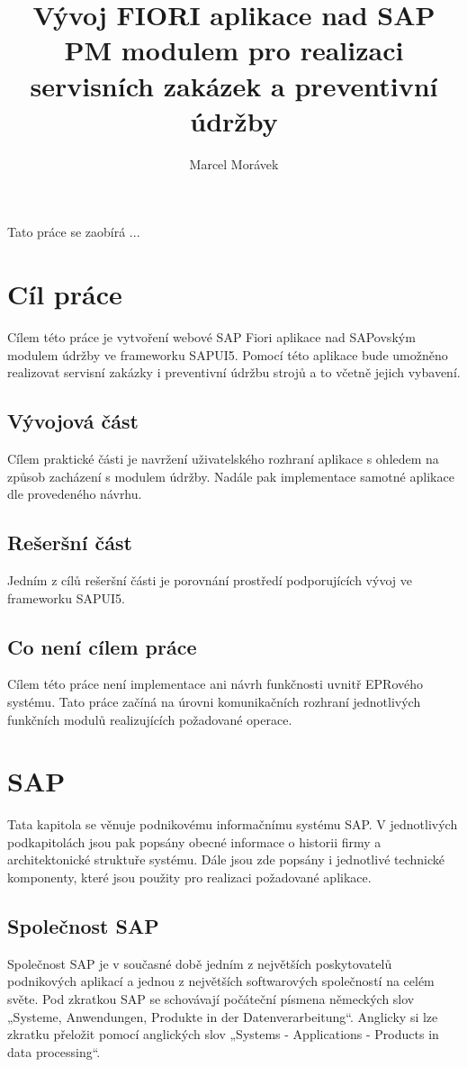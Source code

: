 \documentclass[thesis=M,czech]{FITthesis}[2012/06/26]
\title{Vývoj FIORI aplikace nad SAP PM modulem pro realizaci servisních zakázek a preventivní údržby}
\author{Marcel Morávek} %
\begin{document}

\begin{introduction}
	Tato práce se zaobírá ...
\end{introduction}

\chapter{Cíl práce}
Cílem této práce je vytvoření webové SAP Fiori aplikace nad SAPovským modulem údržby ve frameworku SAPUI5. Pomocí této aplikace bude umožněno realizovat servisní zakázky i preventivní údržbu strojů a to včetně jejich vybavení.

\section{Vývojová část}
Cílem praktické části je navržení uživatelského rozhraní aplikace s ohledem na způsob zacházení s modulem údržby. Nadále pak implementace samotné aplikace dle provedeného návrhu. 

\section{Rešeršní část}
Jedním z cílů rešeršní části je porovnání prostředí podporujících vývoj ve frameworku SAPUI5. 

\section{Co není cílem práce}
Cílem této práce není implementace ani návrh funkčnosti uvnitř EPRového systému. Tato práce začíná na úrovni komunikačních rozhraní jednotlivých funkčních modulů realizujících požadované operace. 

\chapter{SAP}
Tata kapitola se věnuje podnikovému informačnímu systému SAP. V jednotlivých podkapitolách jsou pak popsány obecné informace o historii firmy a architektonické struktuře systému. Dále jsou zde popsány i jednotlivé technické komponenty, které jsou použity pro realizaci požadované aplikace. 
\section{Společnost SAP}
Společnost SAP je v současné době jedním z největších poskytovatelů podnikových aplikací a jednou z největších softwarových společností na celém světe. 
Pod zkratkou SAP se schovávají počáteční písmena německých slov „Systeme, Anwendungen, Produkte in der Datenverarbeitung“. Anglicky si lze zkratku přeložit pomocí anglických slov „Systems - Applications - Products in data processing“.
\end{document}
